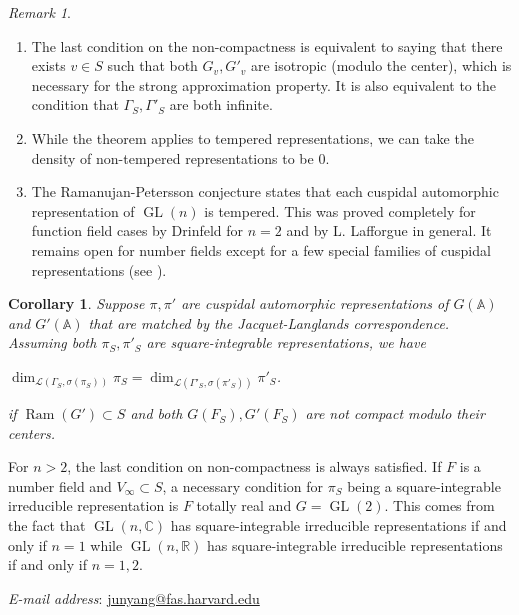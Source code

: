 \documentclass[11pt]{article}
\theoremstyle{plain}
\newtheorem{corollary}[theorem]{Corollary}
\theoremstyle{remark}
\newtheorem{remark}[theorem]{Remark}
\theoremstyle{definition}
\DeclareMathOperator{\GL}{GL}
\DeclareMathOperator{\ram}{Ram}
\begin{document}
\begin{remark}
\begin{enumerate}
    \item The last condition on the non-compactness is equivalent to saying that there exists $v\in S$ such that both $G_v,G'_v$ are isotropic (modulo the center), which is necessary for the strong approximation property. 
    It is also equivalent to the condition that $\Gamma_S,\Gamma'_S$ are both infinite. 
    \item While the theorem applies to tempered representations, we can take the density of non-tempered representations to be $0$. 
    \item The Ramanujan-Petersson conjecture states that each cuspidal automorphic representation of $\GL(n)$ is tempered.
This was proved completely for function field cases by Drinfeld \cite{Drin88} for $n=2$ and by L. Lafforgue \cite{LafL02} in general.  
It remains open for number fields except for a few special families of cuspidal representations (see \cite{Lww2020}).
\end{enumerate}

\end{remark}


\begin{corollary}\label{csqvndim}
Suppose $\pi,\pi'$ are cuspidal automorphic representations of $G(\mathbb{A})$ and $G'(\mathbb{A})$ that are matched by the Jacquet-Langlands correspondence. 
Assuming both $\pi_S,\pi'_S$ are square-integrable representations, we have
\begin{center}
    $\dim_{\mathcal{L}(\Gamma_S,\sigma(\pi_S))}\pi_S=\dim_{\mathcal{L}(\Gamma'_S,\sigma(\pi'_S))}\pi'_S$. 
\end{center}
if $\ram(G')\subset S$ and both $G(F_S),G'(F_S)$ are not compact modulo their centers.
\end{corollary}


For $n> 2$, the last condition on non-compactness is always satisfied. 
If $F$ is a number field and $V_{\infty}\subset S$, a necessary condition for $\pi_S$ being a square-integrable irreducible representation is $F$ totally real and $G=\GL(2)$. 
This comes from the fact that $\GL(n,\mathbb{C})$ has square-integrable irreducible representations if and only if $n=1$ while $\GL(n,\mathbb{R})$ has square-integrable irreducible representations if and only if $n=1,2$. 


{
{

%
\typeout{}
}
}


\textit{E-mail address}: \href{mailto:junyang@fas.harvard.edu}{junyang@fas.harvard.edu}
\end{document}
